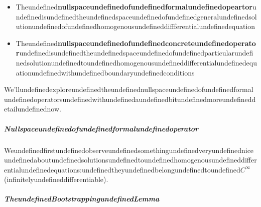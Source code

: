 \begin{itemize}
\item Theundefined\textbf{nullspaceundefinedofundefinedformalundefinedopeartor}undefinedisundefinedtheundefinedspaceundefinedofundefinedgeneralundefinedsolutionundefinedofundefinedhomogenousundefineddiffferentialundefinedequation
\item Theundefined\textbf{nullspaceundefinedofundefinedconcreteundefinedoperator}undefinedisundefinedtheundefinedspaceundefinedofundefinedparticularundefinedsolutionundefinedtoundefinedhomogenousundefineddifferentialundefinedequationundefinedwithundefinedboundaryundefinedconditions
\end{itemize}

We'llundefinedexploreundefinedtheundefinednullspaceundefinedofundefinedformalundefinedoperatorsundefinedwithundefinedaundefinedbitundefinedmoreundefineddetailundefinednow.

\subparagraph{Nullspaceundefinedofundefinedformalundefinedoperator}

Weundefinedfirstundefinedobserveundefinedsomethingundefinedveryundefinedniceundefinedaboutundefinedsolutionsundefinedtoundefinedhomogenousundefineddifferentialundefinedequations:undefinedtheyundefinedbelongundefinedtoundefined$C^{\infty}$(infinitelyundefineddifferentiable).

\subparagraph{TheundefinedBootstrappingundefinedLemma}


